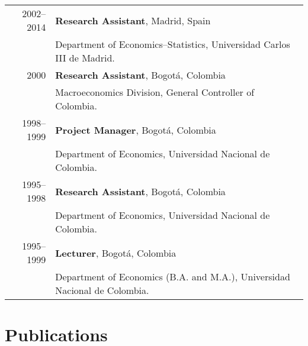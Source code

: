 \documentclass[11pt]{article}\usepackage[]{graphicx}\usepackage[]{color}
\begin{document}
\begin{tabular}{rl{-2cm}}

2002--2014 &  \textbf{Research Assistant}, Madrid, Spain\\
\vspace{5pt}& Department of Economics--Statistics, Universidad Carlos III de Madrid.\\

2000 & \textbf{Research Assistant}, Bogotá, Colombia\\
\vspace{5pt}& Macroeconomics Division, General Controller of Colombia.\\

1998--1999 & \textbf{Project Manager}, Bogotá, Colombia\\
\vspace{5pt}& Department of Economics, Universidad Nacional de Colombia.\\

1995--1998 & \textbf{Research Assistant}, Bogotá, Colombia\\
\vspace{5pt}& Department of Economics, Universidad Nacional de Colombia.}\\

1995--1999 & \textbf{Lecturer}, Bogotá, Colombia\\
\vspace{5pt}& Department of Economics (B.A. and M.A.), Universidad Nacional de Colombia.\\

\end{tabular}
\vspace{10pt}


\section{Publications}
\end{document}
